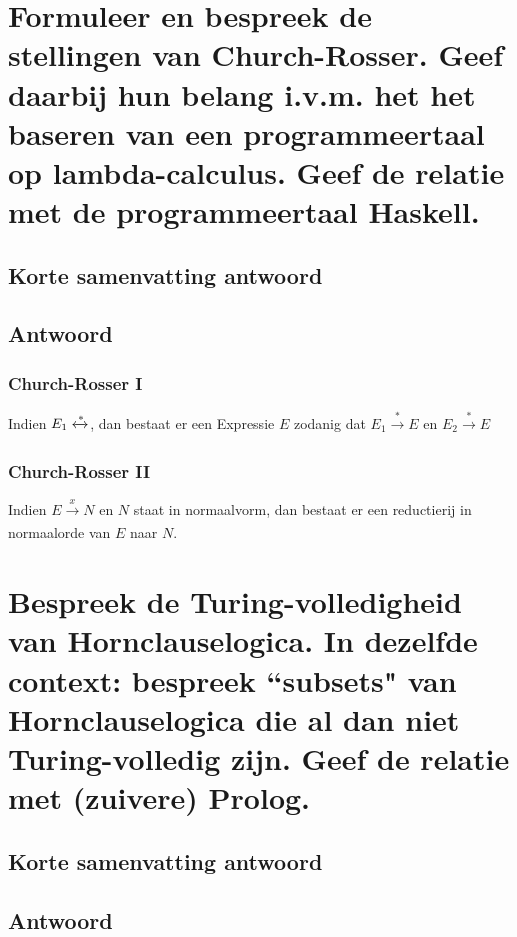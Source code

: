 \documentclass{article}
\begin{document}
\newpage
\section{Formuleer en bespreek de stellingen van Church-Rosser. Geef daarbij hun belang i.v.m. het het baseren van een programmeertaal op lambda-calculus. Geef de relatie met de programmeertaal Haskell.}
    \subsection{Korte samenvatting antwoord}

    \subsection{Antwoord}
        \subsubsection{Church-Rosser I}
            Indien $E_1 \xleftrightarrow[]{*}$, dan bestaat er een Expressie $E$ zodanig dat $E_1 \xrightarrow[]{*} E$ en  $E_2 \xrightarrow[]{*} E$

        \subsubsection{Church-Rosser II}
            Indien $E \xrightarrow[]{x} N$ en $N$ staat in normaalvorm, dan bestaat er een reductierij in normaalorde van $E$ naar $N$.


\newpage
\section{Bespreek de Turing-volledigheid van Hornclauselogica. In dezelfde context: bespreek ``subsets" van Hornclauselogica die al dan niet Turing-volledig zijn. Geef de relatie met (zuivere) Prolog.}
    \subsection{Korte samenvatting antwoord}

    \subsection{Antwoord}
        

\end{document}
